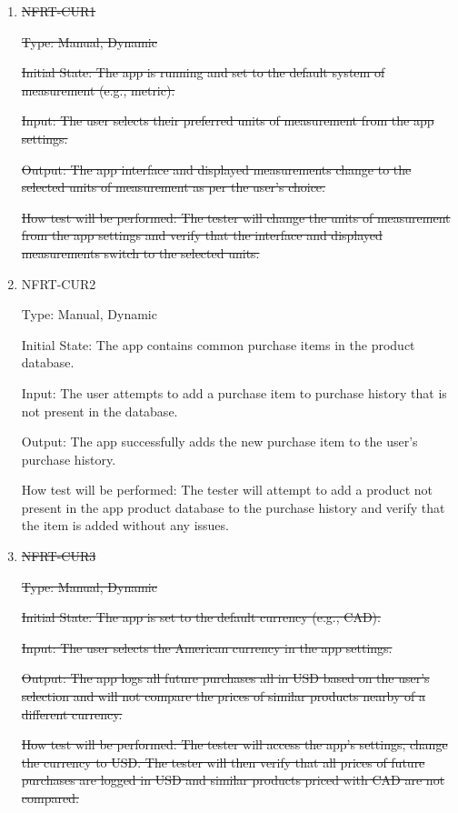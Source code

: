 \documentclass[12pt, titlepage]{article}
\begin{document}
\begin{enumerate}

\item{\sout{NFRT-CUR1}}

\sout{Type: Manual, Dynamic}
					
\sout{Initial State: The app is running and set to the default system of measurement (e.g., metric).}
					
\sout{Input: The user selects their preferred units of measurement from the app settings.}
					
\sout{Output: The app interface and displayed measurements change to the selected units of measurement as per the user's choice.}
					
\sout{How test will be performed: The tester will change the units of measurement from the app settings and verify that the interface and displayed measurements switch to the selected units.}
					
\item{NFRT-CUR2\\}

Type: Manual, Dynamic
					
Initial State: The app contains common purchase items in the product database.
					
Input: The user attempts to add a purchase item to purchase history that is not present in the database.
					
Output: The app successfully adds the new purchase item to the user's purchase history.
					
How test will be performed: The tester will attempt to add a product not present in the app product database to the purchase history and verify that the item is added without any issues.

\item{\sout{NFRT-CUR3}}

\sout{Type: Manual, Dynamic}
					
\sout{Initial State: The app is set to the default currency (e.g., CAD).}
					
\sout{Input: The user selects the American currency in the app settings.}
					
\sout{Output: The app logs all future purchases all in USD based on the user's selection and will not compare the prices of similar products nearby of a different currency.}
					
\sout{How test will be performed: The tester will access the app's settings, change the currency to USD. The tester will then verify that all prices of future purchases are logged in USD and similar products priced with CAD are not compared.}

\end{enumerate}
\end{document}

